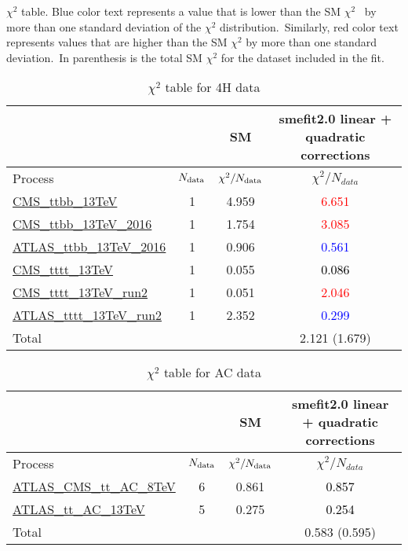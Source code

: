 \documentclass{article}
\begin{document}
$\chi^2$ table. Blue color text represents a value that is lower than the SM $\chi^2$ \
            by more than one standard deviation of the $\chi^2$ distribution.\
            Similarly, red color text represents values that are higher than the SM $\chi^2$ by more than one standard deviation.\
            In parenthesis is the total SM $\chi^2$ for the dataset included in the fit. \\
\begin{table}[H]
\centering
\begin{tabular}{|l|c|c|c|}
\hline
 \multicolumn{2}{|c|}{} & SM& smefit2.0 linear + quadratic corrections\\ \hline
Process & $N_{\rm data}$ & $\chi^ 2/N_{\rm data}$& $\chi^ 2/N_{data}$\\ \hline
\href{https://arxiv.org/abs/1705.10141}{CMS_ttbb_13TeV} & 1 & 4.959 & \textcolor{red}                            {6.651} \\ \hline
\href{https://arxiv.org/abs/1909.05306}{CMS_ttbb_13TeV_2016} & 1 & 1.754 & \textcolor{red}                            {3.085} \\ \hline
\href{https://arxiv.org/abs/1811.12113}{ATLAS_ttbb_13TeV_2016} & 1 & 0.906 & \textcolor{blue}                            {0.561} \\ \hline
\href{https://arxiv.org/abs/1710.10614}{CMS_tttt_13TeV} & 1 & 0.055 & \textcolor{black}                            {0.086} \\ \hline
\href{https://arxiv.org/abs/1908.06463}{CMS_tttt_13TeV_run2} & 1 & 0.051 & \textcolor{red}                            {2.046} \\ \hline
\href{https://arxiv.org/abs/2007.14858}{ATLAS_tttt_13TeV_run2} & 1 & 2.352 & \textcolor{blue}                            {0.299} \\ \hline
\hline Total & &  & 2.121 (1.679) \\ \hline
\end{tabular}
\caption{$\chi^2$ table for 4H data}
\end{table}
\begin{table}[H]
\centering
\begin{tabular}{|l|c|c|c|}
\hline
 \multicolumn{2}{|c|}{} & SM& smefit2.0 linear + quadratic corrections\\ \hline
Process & $N_{\rm data}$ & $\chi^ 2/N_{\rm data}$& $\chi^ 2/N_{data}$\\ \hline
\href{https://arxiv.org/abs/1709.05327}{ATLAS_CMS_tt_AC_8TeV} & 6 & 0.861 & \textcolor{black}                            {0.857} \\ \hline
\href{https://cds.cern.ch/record/2682109}{ATLAS_tt_AC_13TeV} & 5 & 0.275 & \textcolor{black}                            {0.254} \\ \hline
\hline Total & &  & 0.583 (0.595) \\ \hline
\end{tabular}
\caption{$\chi^2$ table for AC data}
\end{table}
\end{document}

